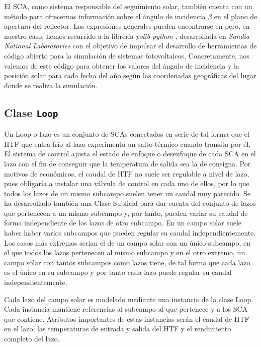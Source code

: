 El SCA, como sistema responsable del seguimiento solar, también cuenta con un método para ofrecernos información sobre el ángulo de incidencia \(\beta\) en el plano de apertura del reflector. Las expresiones generales pueden encontrarse en \cite{duffieSolarEngineeringThermal2006} pero, en nuestro caso, hemos recurrido a la librería \emph{pvlib-python}  \cite{holmgrenPvlibPythonPython2018}, desarrollada en \emph{Sandia National Laboratories} con el objetivo de impulsar el desarrollo de herramientas de código abierto para la simulación de sistemas fotovoltaicos. Concretamente, nos valemos de este código para obtener los valores del ángulo de incidencia y la posición solar para cada fecha del año según las coordenadas geográficas del lugar donde se realiza la simulación.

\subsection{Clase \texttt{Loop}}
\label{loop}

Un Loop o lazo es un conjunto de SCAs conectados en serie de tal forma que el HTF que entra frío al lazo experimenta un salto térmico cuando transita por él. El sistema de control ajusta el estado de enfoque o desenfoque de cada SCA en el lazo con el fin de conseguir que la temperatura de salida sea la de consigna. Por motivos de económicos, el caudal de HTF no suele ser regulable a nivel de lazo, pues obligaría a instalar una válvula de control en cada uno de ellos, por lo que todos los lazos de un mismo subcampo suelen tener un caudal muy parecido. Se ha desarrollado también una Clase Subfield para dar cuenta del conjunto de lazos que pertenecen a un mismo subcampo y, por tanto, pueden variar su caudal de forma independiente de los lazos de otro subcampo. En un campo solar suele haber haber varios subcampos que pueden regular su caudal independientemente. Los casos más extremos serían el de un campo solar con un único subcampo, en el que todos los lazos pertenecen al mismo subcampo y en el otro extremo, un campo solar con tantos subcampos como lazos tiene, de tal forma que cada lazo es el único en su subcampo y por tanto cada lazo puede regular su caudal independientemente. 

Cada lazo del campo solar es modelado mediante una instancia de la clase Loop. Cada instancia mantiene referencias al subcampo al que pertenece y a los SCA que contiene. Atributos importantes de estas instancias serán el caudal de HTF en el lazo, las temperaturas de entrada y salida del HTF y el rendimiento completo del lazo. 

